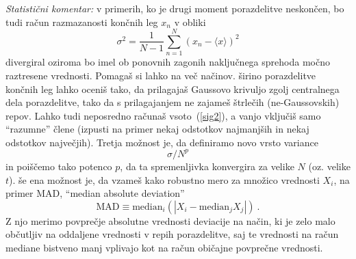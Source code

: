 \documentclass[a4paper, 12pt, slovene]{article}
\begin{document}
{\sl Statistični komentar:} v primerih, ko je drugi moment porazdelitve neskončen, bo tudi račun razmazanosti
končnih leg $x_n$ v obliki
\begin{equation}
\sigma^2 = \frac{1}{N-1} \sum_{n=1}^N \left( x_n - \langle x \rangle \right)^2
\label{sig2}
\end{equation}
divergiral oziroma bo imel ob ponovnih zagonih naključnega sprehoda močno raztresene vrednosti.  Pomagaš si lahko na več načinov. širino porazdelitve končnih leg lahko oceniš tako, da prilagajaš Gaussovo krivuljo zgolj centralnega dela porazdelitve, tako da s prilagajanjem ne zajameš štrlečih (ne-Gaussovskih) repov. Lahko tudi neposredno računaš vsoto~(\ref{sig2}), a vanjo vključiš samo ``razumne'' člene (izpusti na primer nekaj odstotkov najmanjših in nekaj odstotkov največjih). Tretja možnost je, da definiramo novo vrsto variance
\begin{equation*}
  \sigma / N^p
\end{equation*}
in poiščemo tako potenco $p$, da ta spremenljivka konvergira za velike $N$ (oz. velike $t$).  še ena možnost je, da vzameš kako robustno mero za množico vrednosti $X_i$, na primer MAD, ``median absolute deviation''
\begin{equation*}
  \mathrm{MAD} \equiv \mathrm{median}_i\left( | X_i - \mathrm{median}_j X_j | \right) \>.
\end{equation*}
Z njo merimo povprečje absolutne vrednosti deviacije na način, ki je zelo malo občutljiv na oddaljene vrednosti v repih porazdelitve, saj te vrednosti na račun mediane bistveno manj vplivajo kot na račun običajne povprečne vrednosti.
\end{document}
